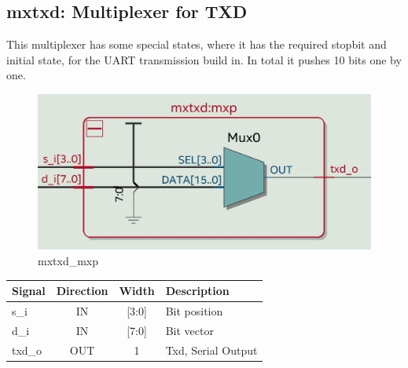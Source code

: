 \documentclass[12pt,a4 paper] {report}
\begin{document}
\newpage

\subsection{mxtxd: Multiplexer for TXD}
This multiplexer has some special states, where it has the required stopbit and initial state, for the UART transmission 
build in. In total it pushes 10 bits one by one.
\begin{figure}[h]
	\centering	
	\includegraphics[scale=0.15]{../png/mxtxd_mxp.png}
	\caption{mxtxd\_mxp}
\end{figure}
\begin{center}
	\begin{tabular}{ | p{2cm} | c | c | p{5cm} |}
		\hline
		\textbf{Signal} & \textbf{Direction} & \textbf{Width} & \textbf{Description} \\
		\hline
		\hline
		s\_i & IN & [3:0] & Bit position \\
		\hline
		d\_i & IN & [7:0] & Bit vector \\
		\hline
		txd\_o & OUT & 1 & Txd, Serial Output \\
		\hline
	\end{tabular}
\end{center} 

\newpage
\end{document}
